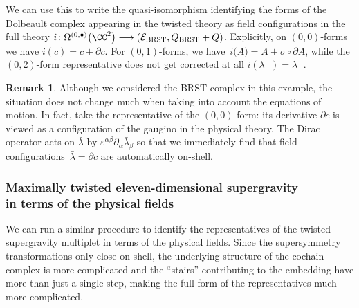 \documentclass[10pt,a4paper]{amsart}
\numberwithin{equation}{section}
\theoremstyle{definition}
\newtheorem{Remark}[Theorem]{Remark}
\def\cE{\mathcal E}\def\cF{\mathcal F}\def\cG{\mathcal G}\def\cH{\mathcal H}
\begin{document}
We can use this to write the quasi-isomorphism identifying the forms of the Dolbeault complex appearing in the twisted theory as field configurations in the full theory
$
 i \colon \Omega^{(0,\bullet)}\big(\CC^2\big) \longrightarrow (\cE_{\rm BRST} , Q_{\rm BRST} + Q)$.
Explicitly, on $(0,0)$-forms we have
$ i(c) = c + \partial c$.
For $(0,1)$-forms, we have~${
 i\big(\bar{A}\big) = \bar{A} + \sigma \circ \partial \bar{A}}$,
while the $(0,2)$-form representative does not get corrected at all
$ {i(\lambda_-) = \lambda_-}$.

\begin{Remark}
 Although we considered the BRST complex in this example, the situation does not change much when taking into account the equations of motion. In fact, take the representative of the $(0,0)$ form: its derivative $\partial c$ is viewed as a configuration of the gaugino in the physical theory. The Dirac operator acts on $\bar{\lambda}$ by $\varepsilon^{\alpha \beta} \partial_\alpha \bar{\lambda}_\beta$ so that we immediately find that field configurations~${\bar{\lambda} = \partial c}$ are automatically on-shell.
\end{Remark}

\subsubsection[Maximally twisted eleven-dimensional supergravity in terms of the physical fields]{Maximally twisted eleven-dimensional supergravity\\ in terms of the physical fields}\label{p: max-stair}

We can run a similar procedure to identify the representatives of the twisted supergravity multiplet in terms of the physical fields. Since the supersymmetry transformations only close on-shell, the underlying structure of the cochain complex is more complicated and the ``stairs'' contributing to the embedding have more than just a single step, making the full form of the representatives much more complicated.
\end{document}
